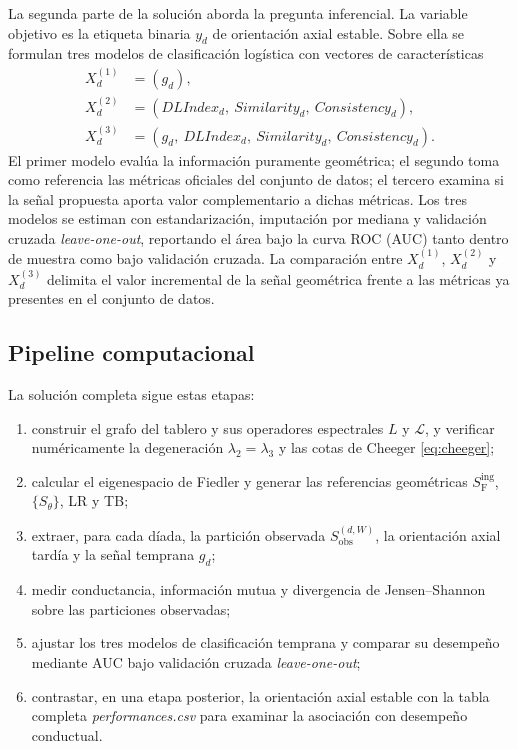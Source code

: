 \documentclass[journal]{IEEEtran}
\newcommand{\Sobs}{S_{\mathrm{obs}}}
\newcommand{\Sing}{S^{\mathrm{ing}}_{\mathrm{F}}}
\begin{document}
La segunda parte de la solución aborda la pregunta inferencial. La variable objetivo es la etiqueta binaria $y_d$ de orientación axial estable. Sobre ella se formulan tres modelos de clasificación logística con vectores de características
\begin{align}
X_d^{(1)} &= (g_d),\\
X_d^{(2)} &= (DLIndex_d,\ Similarity_d,\ Consistency_d),\\
X_d^{(3)} &= (g_d,\ DLIndex_d,\ Similarity_d,\ Consistency_d).
\end{align}
El primer modelo evalúa la información puramente geométrica; el segundo toma como referencia las métricas oficiales del conjunto de datos; el tercero examina si la señal propuesta aporta valor complementario a dichas métricas. Los tres modelos se estiman con estandarización, imputación por mediana y validación cruzada \emph{leave-one-out}, reportando el área bajo la curva ROC (AUC) tanto dentro de muestra como bajo validación cruzada. La comparación entre $X_d^{(1)}$, $X_d^{(2)}$ y $X_d^{(3)}$ delimita el valor incremental de la señal geométrica frente a las métricas ya presentes en el conjunto de datos.

\subsection{Pipeline computacional}

La solución completa sigue estas etapas:
\begin{enumerate}
\item construir el grafo del tablero y sus operadores espectrales $L$ y $\mathcal{L}$, y verificar numéricamente la degeneración $\lambda_2 = \lambda_3$ y las cotas de Cheeger \eqref{eq:cheeger};
\item calcular el eigenespacio de Fiedler y generar las referencias geométricas $\Sing$, $\{S_\theta\}$, LR y TB;
\item extraer, para cada díada, la partición observada $\Sobs^{(d,W)}$, la orientación axial tardía y la señal temprana $g_d$;
\item medir conductancia, información mutua y divergencia de Jensen--Shannon sobre las particiones observadas;
\item ajustar los tres modelos de clasificación temprana y comparar su desempeño mediante AUC bajo validación cruzada \emph{leave-one-out};
\item contrastar, en una etapa posterior, la orientación axial estable con la tabla completa \emph{performances.csv} para examinar la asociación con desempeño conductual.
\end{enumerate}
\end{document}
